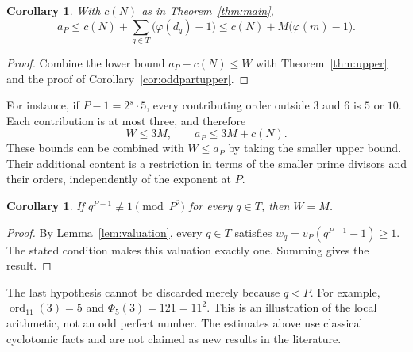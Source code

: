 \documentclass[11pt]{article}
\newtheorem{corollary}[theorem]{Corollary}
\theoremstyle{remark}
\DeclareMathOperator{\ord}{ord}
\begin{document}
\begin{corollary}\label{cor:exponentupper}
With $c(N)$ as in Theorem~\ref{thm:main},
\[
 a_P\le c(N)+\sum_{q\in T}\bigl(\varphi(d_q)-1\bigr)
 \le c(N)+M\bigl(\varphi(m)-1\bigr).
\]
\end{corollary}
\begin{proof}
Combine the lower bound $a_P-c(N)\le W$ with
Theorem~\ref{thm:upper} and the proof of Corollary~\ref{cor:oddpartupper}.
\end{proof}

For instance, if $P-1=2^s\cdot5$, every contributing order outside $3$ and $6$
is $5$ or $10$. Each contribution is at most three, and therefore
\[
 W\le3M,\qquad a_P\le3M+c(N).
\]
These bounds can be combined with $W\le a_P$ by taking the smaller upper
bound. Their additional content is a restriction in terms of the smaller
prime divisors and their orders, independently of the exponent at $P$.

\begin{corollary}\label{cor:nowieferich}
If $q^{P-1}\not\equiv1\pmod{P^2}$ for every $q\in T$, then $W=M$.
\end{corollary}
\begin{proof}
By Lemma~\ref{lem:valuation}, every $q\in T$ satisfies
$w_q=v_P(q^{P-1}-1)\ge1$. The stated condition makes this valuation exactly
one. Summing gives the result.
\end{proof}

The last hypothesis cannot be discarded merely because $q<P$.
For example, $\ord_{11}(3)=5$ and $\Phi_5(3)=121=11^2$.
This is an illustration of the local arithmetic, not an odd perfect number.
The estimates above use classical cyclotomic facts and are not claimed as
new results in the literature.
\end{document}
